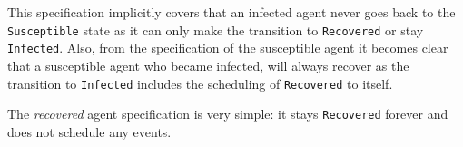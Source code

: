 This specification implicitly covers that an infected agent never goes back to the \texttt{Susceptible} state as it can only make the transition to \texttt{Recovered} or stay \texttt{Infected}. Also, from the specification of the susceptible agent it becomes clear that a susceptible agent who became infected, will always recover as the transition to \texttt{Infected} includes the scheduling of \texttt{Recovered} to itself. 

\medskip

The \textit{recovered} agent specification is very simple: it stays \texttt{Recovered} forever and does not schedule any events.